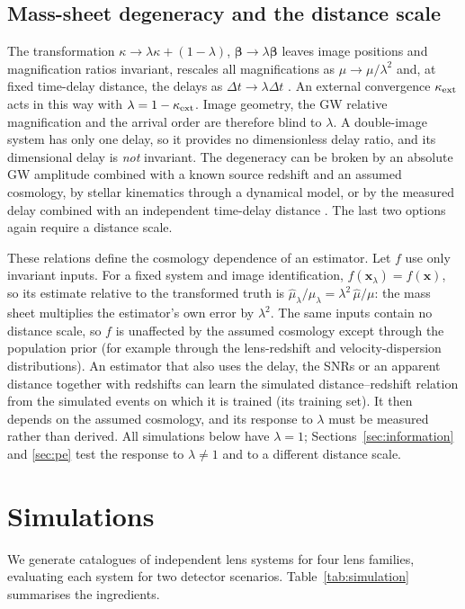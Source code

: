 \subsection{Mass-sheet degeneracy and the distance scale}
\label{sec:msd}
The transformation $\kappa\to\lambda\kappa+(1-\lambda)$, $\boldsymbol\beta\to\lambda\boldsymbol\beta$ leaves image positions and magnification ratios invariant, rescales all magnifications as $\mu\to\mu/\lambda^2$ and, at fixed time-delay distance, the delays as $\Delta t\to\lambda\Delta t$ \citep{falco1985msd,schneider2013msd}. An external convergence $\kappa_{\rm ext}$ acts in this way with $\lambda=1-\kappa_{\rm ext}$. Image geometry, the GW relative magnification and the arrival order are therefore blind to $\lambda$. A double-image system has only one delay, so it provides no dimensionless delay ratio, and its dimensional delay is \emph{not} invariant. The degeneracy can be broken by an absolute GW amplitude combined with a known source redshift and an assumed cosmology, by stellar kinematics through a dynamical model, or by the measured delay combined with an independent time-delay distance \citep{poon2025degeneracy}. The last two options again require a distance scale.

These relations define the cosmology dependence of an estimator. Let $f$ use only invariant inputs. For a fixed system and image identification, $f(\boldsymbol x_\lambda)=f(\boldsymbol x)$, so its estimate relative to the transformed truth is $\hat\mu_\lambda/\mu_\lambda=\lambda^2\,\hat\mu/\mu$: the mass sheet multiplies the estimator's own error by $\lambda^2$. The same inputs contain no distance scale, so $f$ is unaffected by the assumed cosmology except through the population prior (for example through the lens-redshift and velocity-dispersion distributions). An estimator that also uses the delay, the SNRs or an apparent distance together with redshifts can learn the simulated distance--redshift relation from the simulated events on which it is trained (its training set). It then depends on the assumed cosmology, and its response to $\lambda$ must be measured rather than derived. All simulations below have $\lambda=1$; Sections~\ref{sec:information} and \ref{sec:pe} test the response to $\lambda\neq1$ and to a different distance scale.

\section{Simulations}
\label{sec:simulation}
We generate catalogues of independent lens systems for four lens families, evaluating each system for two detector scenarios. Table~\ref{tab:simulation} summarises the ingredients.

